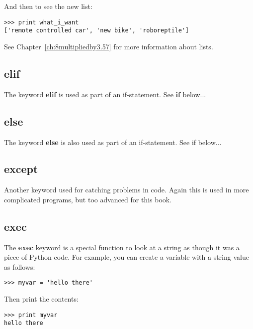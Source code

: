 \noindent
And then to see the new list:

\begin{listing}
\begin{verbatim}
>>> print what_i_want
['remote controlled car', 'new bike', 'roboreptile']
\end{verbatim}
\end{listing}

\noindent
See Chapter~\ref{ch:8multipliedby3.57} for more information about lists.

\subsection*{elif}

The keyword \textbf{elif} is used as part of an if-statement.  See \textbf{if} below...

\subsection*{else}

The keyword \textbf{else} is also used as part of an if-statement.  See if below...

\subsection*{except}

Another keyword used for catching problems in code. Again this is used in more complicated programs, but too advanced for this book.

\subsection*{exec}

The \textbf{exec} keyword is a special function to look at a string as though it was a piece of Python code. For example, you can create a variable with a string value as follows:

\begin{listing}
\begin{verbatim}
>>> myvar = 'hello there'
\end{verbatim}
\end{listing}

\noindent
Then print the contents:

\begin{listing}
\begin{verbatim}
>>> print myvar
hello there
\end{verbatim}
\end{listing}

